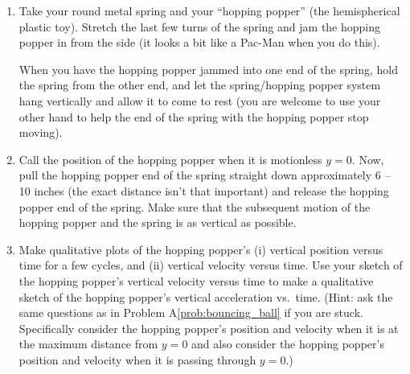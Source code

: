\begin{exercise}
  \begin{enumerate}
  \item Take your round metal spring and your ``hopping popper'' (the
    hemispherical plastic toy). Stretch the last few turns of the spring and jam the hopping popper in from the side (it looks a
    bit like a Pac-Man when you do this).
    
    When you have the hopping popper jammed into one end of the spring, 
    hold the spring from the other end, and let the
    spring/hopping popper system hang vertically and allow it to come to rest
    (you are welcome to use your other hand to help the end of the
    spring with the hopping popper stop moving). 
 
  \item Call the position of the hopping popper when it is motionless $y = 0$.
    Now, pull the hopping popper end of the spring straight down approximately 6
    -- 10 inches (the exact distance isn't that important) and release
    the hopping popper end of the spring.  Make sure that the subsequent motion
    of the hopping popper and the spring is as vertical as possible.

  \item Make qualitative plots of the hopping popper's (i) vertical position
    versus time for a few cycles, and (ii) vertical velocity versus
    time.  Use your sketch of the hopping popper's vertical velocity versus time
    to make a qualitative sketch of the hopping popper's vertical acceleration
    vs.\ time.  (Hint: ask the same questions as in Problem
    A\ref{prob:bouncing_ball} if you are stuck.  Specifically consider
    the hopping popper's position and velocity when it is at the maximum
    distance from $y = 0$ and also consider the hopping popper's position and
    velocity when it is passing through $y = 0$.)
  \end{enumerate}
  \label{prob:graphII}
\end{exercise}


